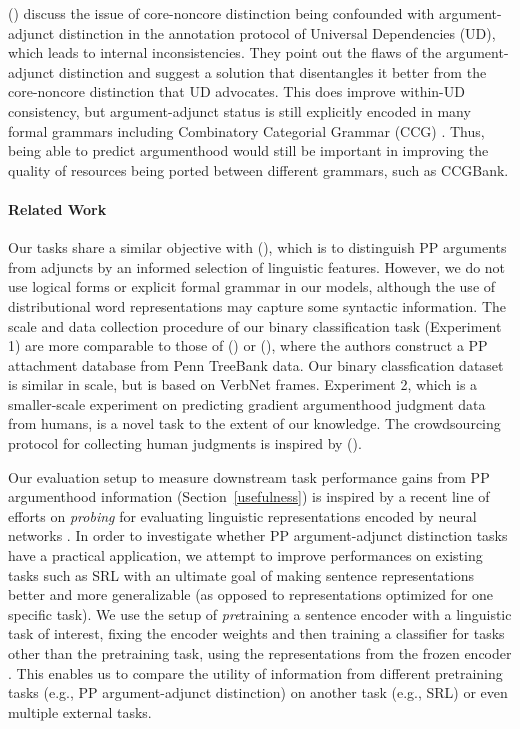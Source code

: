 \documentclass[letterpaper]{article} %
\begin{document}
\citeauthor{przepiorkowski2018arguments} (\citeyear{przepiorkowski2018arguments}) discuss the issue of core-noncore distinction being confounded with argument-adjunct distinction in the annotation protocol of Universal Dependencies (UD), which leads to internal inconsistencies. They point out the flaws of the argument-adjunct distinction and suggest a solution that disentangles it better from the core-noncore distinction that UD advocates. This does improve within-UD consistency, but argument-adjunct status is still explicitly encoded in many formal grammars including Combinatory Categorial Grammar (CCG) \cite{steedman2000syntactic}. Thus, being able to predict argumenthood would still be important in improving the quality of resources being ported between different grammars, such as CCGBank.

\paragraph{Related Work}
Our tasks share a similar objective with \citeauthor{villavicencio2002learning} (\citeyear{villavicencio2002learning}), which is to distinguish PP arguments from adjuncts by an informed selection of linguistic features. However, we do not use logical forms or explicit formal grammar in our models, although the use of distributional word representations may capture some syntactic information. The scale and data collection procedure of our binary classification task (Experiment 1) are more comparable to those of \citeauthor{merlo2006notion} (\citeyear{merlo2006notion}) or \citeauthor{belinkov2014exploring} (\citeyear{belinkov2014exploring}), where the authors construct a PP attachment database from Penn TreeBank data. Our binary classfication dataset is similar in scale, but is based on VerbNet \cite{verbnet} frames. Experiment 2, which is a smaller-scale experiment on predicting gradient argumenthood judgment data from humans, is a novel task to the extent of our knowledge. The crowdsourcing protocol for collecting human judgments is inspired by \citeauthor{rissman2015using} (\citeyear{rissman2015using}).

Our evaluation setup to measure downstream task performance gains from PP argumenthood information (Section~\ref{usefulness}) is inspired by a recent line of efforts on \textit{probing} for evaluating linguistic representations encoded by neural networks \cite{gulordava2018colorless,ettinger2018assessing}. In order to investigate whether PP argument-adjunct distinction tasks have a practical application, we attempt to improve performances on existing tasks such as SRL with an ultimate goal of making sentence representations better and more generalizable (as opposed to representations optimized for one specific task). We use the setup of \textit{pre}training a sentence encoder with a linguistic task of interest, fixing the encoder weights and then training a classifier for tasks other than the pretraining task, using the representations from the frozen encoder \cite{bowman2018looking}. This enables us to compare the utility of information from different pretraining tasks (e.g., PP argument-adjunct distinction) on another task (e.g., SRL) or even multiple external tasks.
\end{document}
